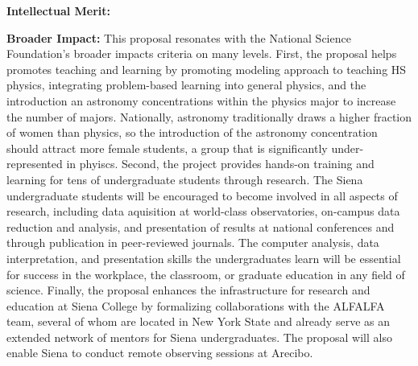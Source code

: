 \documentclass[12pt, preprint]{aastex}
\begin{document}
{{\bf Intellectual Merit:} 


{\bf Broader Impact:} This proposal resonates with the National Science Foundation's {broader impacts}
criteria on many levels.  
First, the proposal helps promotes teaching and learning by
promoting
modeling approach to teaching HS physics, integrating problem-based learning into general physics,
and the introduction an astronomy 
concentrations within the physics major to increase the number of majors.
Nationally, astronomy traditionally draws a higher fraction of women than physics, so 
the introduction of the astronomy concentration should attract more female students, 
a group that is significantly under-represented in phyiscs.
Second, the project provides hands-on training and learning for tens of 
undergraduate students through research.  
The Siena undergraduate students will be 
encouraged to become involved in all aspects
of research, including data aquisition at world-class observatories, on-campus 
data reduction and analysis, and presentation of results at national
conferences and through publication in peer-reviewed journals.
The computer analysis, data interpretation, and presentation skills the
undergraduates learn 
will be essential for success in
the workplace, the classroom, or graduate education in any field of science. 
Finally,
the proposal enhances the infrastructure for research and education at Siena College 
by formalizing collaborations
with the ALFALFA team, several of whom are located in New York State and already serve as an
extended network of mentors for Siena undergraduates.
The proposal will also enable Siena to conduct remote observing sessions at Arecibo.

}
\end{document}
